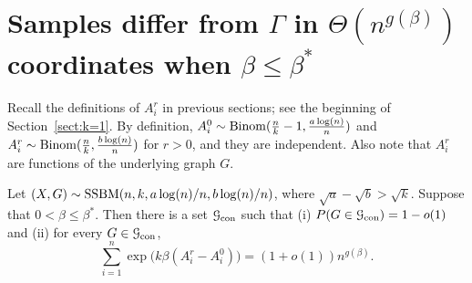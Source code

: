 \documentclass{article}
\begin{document}
\section{Samples differ from $\Gamma$ in $\Theta(n^{g(\beta)})$ coordinates when $\beta\le\beta^\ast$}  \label{sect:struct}
Recall the definitions of $A^r_i$ in previous sections; see the beginning of Section~\ref{sect:k=1}. 
By definition,
$A^0_i\sim \operatorname{Binom}(\frac{n}{k}-1,\frac{a\log(n)}{n})$ and $A^r_i\sim \operatorname{Binom}(\frac{n}{k}, \frac{b\log(n)}{n})$ for $r>0$, and they are independent. 
Also note that $A^r_i$ are functions of the underlying graph $G$.

\begin{proposition}  \label{prop:con}
Let $(X,G)\sim \operatorname{SSBM}(n,k, a\log(n)/n, b\log(n)/n)$, where $\sqrt{a}-\sqrt{b} > \sqrt{k}$.
Suppose that $0< \beta\le \beta^\ast$.
Then there is a set $\mathcal{G}_{\operatorname{con}}$ such that (i) $P(G \in \mathcal{G}_{\operatorname{con}}) = 1-o(1)$ and (ii) for every $G\in \mathcal{G}_{\operatorname{con}}$, 
$$
\sum_{i=1}^n \exp\big(k\beta (A^r_i-A^0_i) \big)
=(1+o(1)) n^{g(\beta)} .
$$
\end{proposition}
\end{document}
